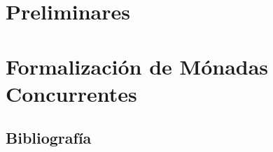 \documentclass[a4paper,spanish,fixlanguage]{book}
\begin{document}




\frontmatter

\setcounter{tocdepth}{1}
\tableofcontents

\mainmatter



\part{Preliminares}\label{part:pre}





\part{Formalización de Mónadas Concurrentes}\label{part:mc}
 




\begin{appendices}

\end{appendices}

\backmatter

\chapter{Bibliograf\'{i}a}





\end{document}
